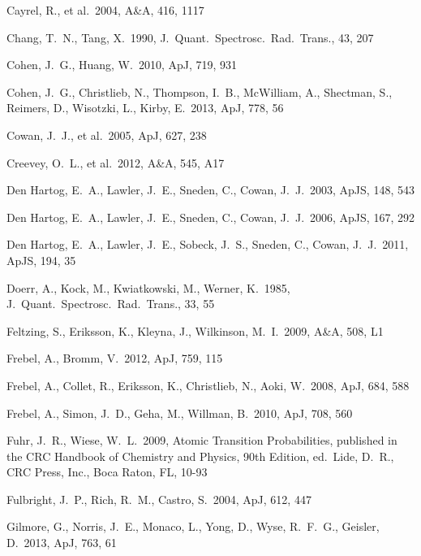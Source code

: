 \documentclass[useAMS,usenatbib,usegraphicx]{mn2e}
\def\apj{ApJ}
\def\aap{A\&A}
\def\apjs{ApJS}
\def\jqsrt{J.\ Quant.\ Spectrosc.\ Rad.\ Trans.}
\begin{document}
\begin{thebibliography}{}
 Cayrel, R., 
et al.\ 2004, \aap, 416, 1117

 Chang, T.~N., Tang, X.\ 1990, 
\jqsrt, 43, 207 

 Cohen, J.~G., Huang, W.\ 
2010, \apj, 719, 931 

 Cohen, J.~G., Christlieb, N.,
Thompson, I.~B., McWilliam, A., Shectman, S., Reimers, D., 
Wisotzki, L., Kirby, E.\ 2013, \apj, 778, 56

 Cowan, J.~J., 
et al.\ 2005, \apj, 627, 238 

 Creevey, O.~L., 
et al.\ 2012, \aap, 545, A17 

 Den Hartog, E.~A., 
Lawler, J.~E., Sneden, C., Cowan, J.~J.\ 2003, \apjs, 148, 543 

 Den Hartog, E.~A., 
Lawler, J.~E., Sneden, C., Cowan, J.~J.\ 2006, \apjs, 167, 292 

 Den Hartog, E.~A., 
Lawler, J.~E., Sobeck, J.~S., Sneden, C., 
Cowan, J.~J.\ 2011, \apjs, 194, 35 

 Doerr, A., Kock, M., 
Kwiatkowski, M., Werner, K.\ 1985, \jqsrt, 33, 55 

 Feltzing, S., Eriksson, K., 
Kleyna, J., Wilkinson, M.~I.\ 2009, \aap, 508, L1 

 Frebel, A., Bromm, V.\ 
2012, \apj, 759, 115 

 Frebel, A., Collet, R.,
Eriksson, K., Christlieb, N., Aoki, W.\ 2008, \apj, 684, 588

 Frebel, A., Simon, 
J.~D., Geha, M., Willman, B.\ 2010, \apj, 708, 560 

 Fuhr, J.~R., Wiese, W.~L.\ 2009,
Atomic Transition Probabilities, published in the CRC Handbook of Chemistry 
and Physics, 90th Edition, ed.\ Lide, D.~R., CRC Press, Inc., 
Boca Raton, FL, 10-93

Fulbright, J.~P., Rich, R.~M., Castro, S.\ 2004, \apj, 612, 447 

\bibitem[Gilmore et al.(2013)]{gilmore13} Gilmore, G., Norris, 
J.~E., Monaco, L., Yong, D., Wyse, R.~F.~G., Geisler, D.\
2013, \apj, 763, 61 


\end{thebibliography}
\end{document}
